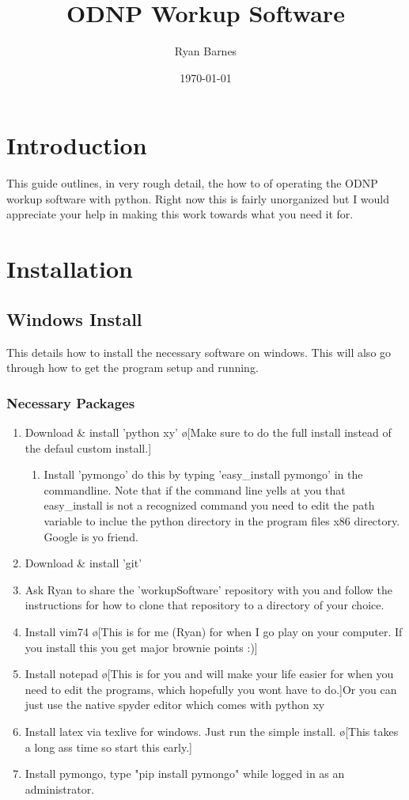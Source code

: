 \documentclass[10pt]{book}
\author{Ryan Barnes}
\title{ODNP Workup Software}
\date{\today}
\begin{document}
\maketitle
\chapter{Introduction}
This guide outlines, in very rough detail, the how to of operating the ODNP workup software with python. Right now this is fairly unorganized but I would appreciate your help in making this work towards what you need it for. 

\chapter{Installation}
\section{Windows Install}
This details how to install the necessary software on windows. This will also go through how to get the program setup and running.
\subsection{Necessary Packages}
\begin{enumerate}
    \item Download \& install 'python xy' \o[Make sure to do the full install instead of the defaul custom install.]{}
        \begin{enumerate}
            \item Install 'pymongo' do this by typing 'easy_install pymongo' in the commandline. Note that if the command line yells at you that easy_install is not a recognized command you need to edit the path variable to inclue the python directory in the program files x86 directory. Google is yo friend.
        \end{enumerate}
    \item Download \& install 'git'
    \item Ask Ryan to share the 'workupSoftware' repository with you and follow the instructions for how to clone that repository to a directory of your choice.
    \item Install vim74 \o[This is for me (Ryan) for when I go play on your computer. If you install this you get major brownie points :)]{}
    \item Install notepad \o[This is for you and will make your life easier for when you need to edit the programs, which hopefully you wont have to do.]{Or you can just use the native spyder editor which comes with python xy}
    \item Install latex via texlive for windows. Just run the simple install. \o[This takes a long ass time so start this early.]{}
    \item Install pymongo, type "pip install pymongo" while logged in as an administrator.
\end{enumerate}
\end{document}
